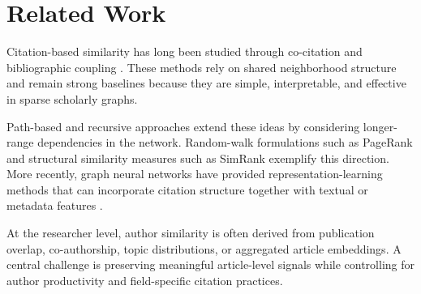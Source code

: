 \section{Related Work}
\label{sec:related-work}

Citation-based similarity has long been studied through co-citation
\citep{small1973cocitation} and bibliographic coupling \citep{kessler1963bibliographic}.
These methods rely on shared neighborhood structure and remain strong baselines because
they are simple, interpretable, and effective in sparse scholarly graphs.

Path-based and recursive approaches extend these ideas by considering longer-range
dependencies in the network. Random-walk formulations such as PageRank
\citep{page1999pagerank} and structural similarity measures such as SimRank
\citep{jeh2002simrank} exemplify this direction. More recently, graph neural networks have
provided representation-learning methods that can incorporate citation structure together
with textual or metadata features \citep{kipf2017gcn}.

At the researcher level, author similarity is often derived from publication overlap,
co-authorship, topic distributions, or aggregated article embeddings. A central challenge
is preserving meaningful article-level signals while controlling for author productivity
and field-specific citation practices.
